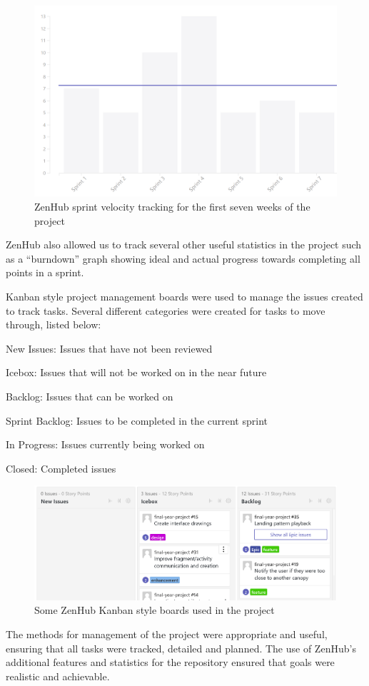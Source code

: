 \begin{figure}[ht]
  \includegraphics[width=\linewidth]{img/velocity-tracking.png}
  \caption{ZenHub sprint velocity tracking for the first seven weeks of the project}\label{fig:velocity-tracking}
\end{figure}

ZenHub also allowed us to track several other useful statistics in the project such as a ``burndown'' graph showing ideal and actual progress towards completing all points in a sprint.

Kanban style project management boards were used to manage the issues created to track tasks. Several different categories were created for tasks to move through, listed below:
\begin{description}
  \item New Issues: Issues that have not been reviewed
  \item Icebox: Issues that will not be worked on in the near future
  \item Backlog: Issues that can be worked on
  \item Sprint Backlog: Issues to be completed in the current sprint
  \item In Progress: Issues currently being worked on
  \item Closed: Completed issues
\end{description}

\begin{figure}[ht]
  \includegraphics[width=\linewidth]{img/issue-board.png}
  \caption{Some ZenHub Kanban style boards used in the project}
\end{figure}

The methods for management of the project were appropriate and useful, ensuring that all tasks were tracked, detailed and planned. The use of ZenHub's additional features and statistics for the repository ensured that goals were realistic and achievable.
